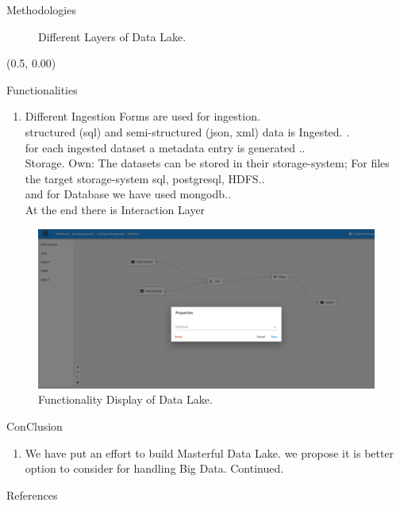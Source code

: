 \documentclass[12pt]{beamer}
\begin{document}
\begin{textblock}{0.5}
\begin{block}{Methodologies}
\begin{figure}
\caption{Different Layers of Data Lake. }
\end{figure}
\end{block}






\end{textblock}
\begin{textblock}{0.5}(0.5, 0.00)

\begin{block}{Functionalities}
\begin{enumerate}
\item Different Ingestion Forms are used for ingestion.\\
structured (sql) and semi-structured (json, xml) data is Ingested. .\\ for each ingested dataset a metadata entry is generated ..\\
Storage.
Own: The datasets can be stored in their storage-system; For files the target storage-system  sql, postgresql, HDFS..\\ and for Database we have used  mongodb..\\
At the end there is Interaction Layer

\end{enumerate}




\begin{figure}
\includegraphics[width=0.99\columnwidth]{graphics/Functionality.jpeg}%

\caption{Functionality Display of Data Lake.}
\end{figure}
\end{block}

\begin{block}{ConClusion}
\begin{enumerate}
\item We have put an effort to build Masterful Data Lake. we propose it is better option to consider for handling Big Data. Continued.
\end{enumerate}
\end{block}

\vfill\vspace{7.5mm} %
\begin{block}{References}
\nocite{*}
\parbox{\textwidth}{
\AtNextBibliography{\small}
\printbibliography
}
\end{block}

\end{textblock}
\end{document}
